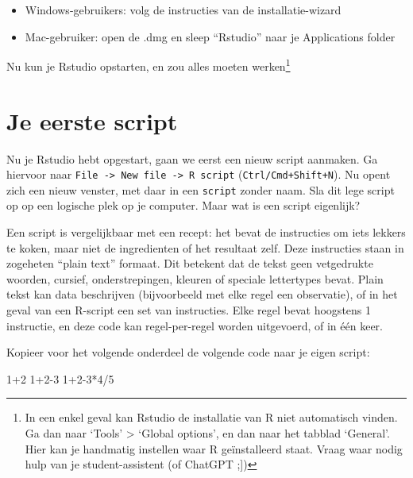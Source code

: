 \documentclass[
  a4paper,
]{scrbook}
\newenvironment{Shaded}{\begin{snugshade}}{\end{snugshade}}
\newcommand{\DecValTok}[1]{\textcolor[rgb]{0.68,0.00,0.00}{#1}}
\newcommand{\SpecialCharTok}[1]{\textcolor[rgb]{0.37,0.37,0.37}{#1}}
\theoremstyle{definition}
\theoremstyle{remark}
\begin{document}
\begin{itemize}
\item
  Windows-gebruikers: volg de instructies van de installatie-wizard
\item
  Mac-gebruiker: open de .dmg en sleep ``Rstudio'' naar je Applications
  folder
\end{itemize}

Nu kun je Rstudio opstarten, en zou alles moeten werken\footnote{In een
  enkel geval kan Rstudio de installatie van R niet automatisch vinden.
  Ga dan naar `Tools' \textgreater{} `Global options', en dan naar het
  tabblad `General'. Hier kan je handmatig instellen waar R
  geïnstalleerd staat. Vraag waar nodig hulp van je student-assistent
  (of ChatGPT ;{]})}

\section{Je eerste script}\label{je-eerste-script}

Nu je Rstudio hebt opgestart, gaan we eerst een nieuw script aanmaken.
Ga hiervoor naar
\texttt{File\ -\textgreater{}\ New\ file\ -\textgreater{}\ R\ script}
(\texttt{Ctrl/Cmd+Shift+N}). Nu opent zich een nieuw venster, met daar
in een \texttt{script} zonder naam. Sla dit lege script op op een
logische plek op je computer. Maar wat is een script eigenlijk?

Een script is vergelijkbaar met een recept: het bevat de instructies om
iets lekkers te koken, maar niet de ingredienten of het resultaat zelf.
Deze instructies staan in zogeheten ``plain text'' formaat. Dit betekent
dat de tekst geen vetgedrukte woorden, cursief, onderstrepingen, kleuren
of speciale lettertypes bevat. Plain tekst kan data beschrijven
(bijvoorbeeld met elke regel een observatie), of in het geval van een
R-script een set van instructies. Elke regel bevat hoogstens 1
instructie, en deze code kan regel-per-regel worden uitgevoerd, of in
één keer.

Kopieer voor het volgende onderdeel de volgende code naar je eigen
script:

\begin{Shaded}
\begin{Highlighting}[]
\DecValTok{1}\SpecialCharTok{+}\DecValTok{2}
\DecValTok{1}\SpecialCharTok{+}\DecValTok{2{-}3}
\DecValTok{1}\SpecialCharTok{+}\DecValTok{2{-}3}\SpecialCharTok{*}\DecValTok{4}\SpecialCharTok{/}\DecValTok{5}
\end{Highlighting}
\end{Shaded}
\end{document}
